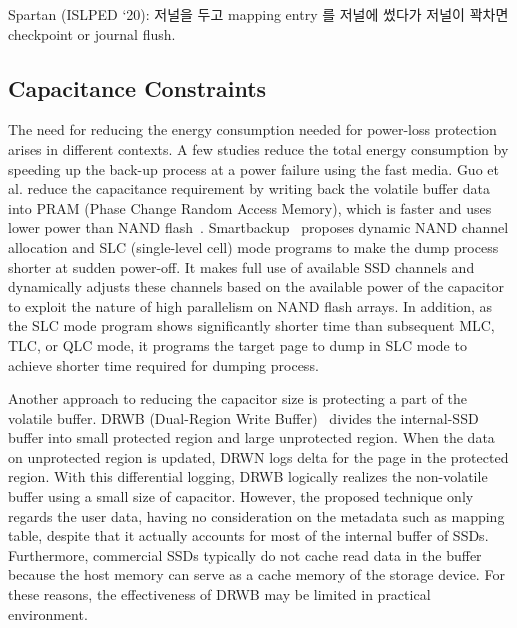 Spartan (ISLPED ‘20): 저널을 두고 mapping entry 를 저널에 썼다가 저널이 꽉차면 checkpoint or journal flush. 
\fi


\subsection{Capacitance Constraints}
\fi
The need for reducing the energy consumption needed for power-loss protection
arises in different contexts. A few studies reduce the total energy consumption
by speeding up the back-up process at a power failure using the fast media. Guo
et al. reduce the capacitance requirement by writing back the volatile buffer
data into PRAM (Phase Change Random Access Memory), which is faster and uses
lower power than NAND flash~\cite{GuoYZC13date}. 
Smartbackup~\cite{HuangWQLS15hpcc}
proposes dynamic NAND channel allocation and SLC (single-level cell) mode
programs to make the dump process shorter at sudden power-off. It makes full
use of available SSD channels and dynamically adjusts these channels based on
the available power of the capacitor to exploit the nature of high parallelism
on NAND flash arrays.  In addition, as the SLC mode program shows significantly
shorter time than subsequent MLC, TLC, or QLC mode, it programs the target page
to dump in SLC mode to achieve shorter time required for dumping process.


Another approach to reducing the capacitor size is protecting a part of the 
volatile buffer. DRWB (Dual-Region Write Buffer)~\cite{KimK15sac} divides the internal-SSD
buffer into small protected region and large unprotected region. When the data on unprotected region is updated, DRWN logs delta for the page in the protected region. With
this differential logging, DRWB logically realizes the non-volatile buffer
using a small size of capacitor. However, the proposed technique only regards
the user data, having no consideration on the metadata such as mapping table, 
despite that it actually accounts for most of the internal buffer of SSDs.  Furthermore,
commercial SSDs typically do not cache read data in the buffer because the host
memory can serve as a cache memory of the storage device. For these reasons,
the effectiveness of DRWB may be limited in practical environment. 

